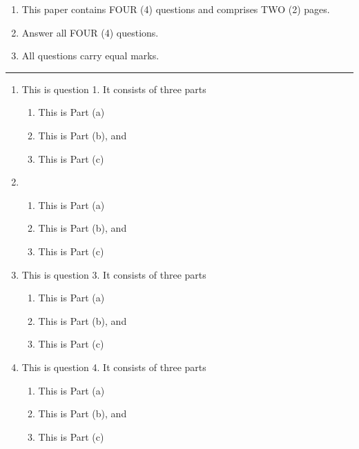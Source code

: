 \documentclass[12pt,fleqn]{exampaper}
\begin{document}
\begin{enumerate}
  \item This paper contains FOUR (4) questions and comprises TWO (2) pages.
  \item Answer all FOUR (4) questions.
  \item All questions carry equal marks.
\end{enumerate}

\vspace{10mm} \hrule \vspace{10mm}


\begin{enumerate}
  \item This is question 1. It consists of three parts
  \begin{enumerate}
    \item This is Part (a)
    \item This is Part (b), and
    \item This is Part (c)
  \end{enumerate}

  \item
  \begin{enumerate}
    \item This is Part (a)
    \item This is Part (b), and
    \item This is Part (c)
  \end{enumerate}

\newpage

  \item This is question 3. It consists of three parts
  \begin{enumerate}
    \item This is Part (a)
    \item This is Part (b), and
    \item This is Part (c)
  \end{enumerate}

  \item This is question 4. It consists of three parts
  \begin{enumerate}
    \item This is Part (a)
    \item This is Part (b), and
    \item This is Part (c)
  \end{enumerate}

\end{enumerate}
\end{document}

